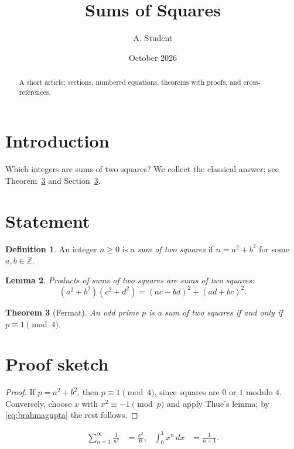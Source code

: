 \documentclass{article}
\title{Sums of Squares}
\author{A. Student}
\date{October 2026}
\newtheorem{theorem}{Theorem}[section]
\newtheorem{lemma}[theorem]{Lemma}
\theoremstyle{definition}
\newtheorem{definition}[theorem]{Definition}
\begin{document}
\maketitle
\begin{abstract}
A short article: sections, numbered equations, theorems with proofs, and cross-references.
\end{abstract}
\tableofcontents

\section{Introduction}\label{sec:intro}
Which integers are sums of two squares? We collect the classical answer; see Theorem~\ref{thm:fermat}
and Section~\ref{sec:proof}.

\section{Statement}
\begin{definition}
An integer $n \ge 0$ is a \emph{sum of two squares} if $n = a^2 + b^2$ for some $a, b \in \mathbb{Z}$.
\end{definition}

\begin{lemma}\label{lem:product}
Products of sums of two squares are sums of two squares:
\begin{equation}\label{eq:brahmagupta}
(a^2+b^2)(c^2+d^2) = (ac-bd)^2 + (ad+bc)^2 .
\end{equation}
\end{lemma}

\begin{theorem}[Fermat]\label{thm:fermat}
An odd prime $p$ is a sum of two squares if and only if $p \equiv 1 \pmod 4$.
\end{theorem}

\section{Proof sketch}\label{sec:proof}
\begin{proof}
If $p = a^2 + b^2$, then $p \equiv 1 \pmod 4$, since squares are $0$ or $1$ modulo $4$. Conversely,
choose $x$ with $x^2 \equiv -1 \pmod p$ and apply Thue's lemma; by \eqref{eq:brahmagupta} the rest follows.
\end{proof}

\begin{align}
  \sum_{n=1}^{\infty} \frac{1}{n^2} &= \frac{\pi^2}{6}, &
  \int_0^1 x^n \, dx &= \frac{1}{n+1}.
\end{align}
\end{document}
